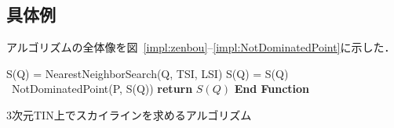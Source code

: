 \documentclass{fit}
\theoremstyle{definition}
\newcommand{\Fig}[1]{図~#1}
\begin{document}





\subsection{具体例}
アルゴリズムの全体像を\Fig{\ref{impl:zenbou}--\ref{impl:NotDominatedPoint}}に示した．

\begin{algorithm}[t]
  \SetAlgoLined
  \DontPrintSemicolon
  {
    S(Q) = NearestNeighborSearch(Q, TSI, LSI)\;
    S(Q) = S(Q) \cup ~NotDominatedPoint(P, S(Q))\;
    \textbf{return} $S(Q)$
  }
  \textbf{End Function}
  \caption{3次元TIN上でスカイラインを求めるアルゴリズム}
  \label{impl:zenbou}
\end{algorithm}
\end{document}
